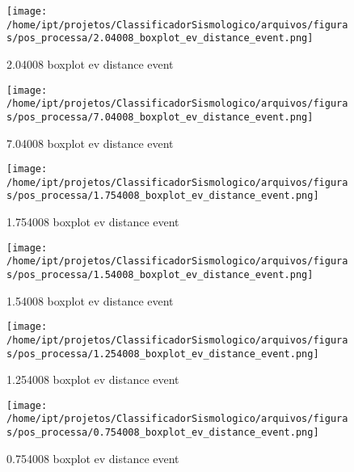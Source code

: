     \begin{figure}[H]
        \centering
        \texttt{[image: /home/ipt/projetos/ClassificadorSismologico/arquivos/figuras/pos\_processa/2.04008\_boxplot\_ev\_distance\_event.png]}
        \caption{2.04008 boxplot ev distance event}
        \label{fig:2.04008_boxplot_ev_distance_event}
    \end{figure}
                

    \begin{figure}[H]
        \centering
        \texttt{[image: /home/ipt/projetos/ClassificadorSismologico/arquivos/figuras/pos\_processa/7.04008\_boxplot\_ev\_distance\_event.png]}
        \caption{7.04008 boxplot ev distance event}
        \label{fig:7.04008_boxplot_ev_distance_event}
    \end{figure}
                

    \begin{figure}[H]
        \centering
        \texttt{[image: /home/ipt/projetos/ClassificadorSismologico/arquivos/figuras/pos\_processa/1.754008\_boxplot\_ev\_distance\_event.png]}
        \caption{1.754008 boxplot ev distance event}
        \label{fig:1.754008_boxplot_ev_distance_event}
    \end{figure}
                

    \begin{figure}[H]
        \centering
        \texttt{[image: /home/ipt/projetos/ClassificadorSismologico/arquivos/figuras/pos\_processa/1.54008\_boxplot\_ev\_distance\_event.png]}
        \caption{1.54008 boxplot ev distance event}
        \label{fig:1.54008_boxplot_ev_distance_event}
    \end{figure}
                

    \begin{figure}[H]
        \centering
        \texttt{[image: /home/ipt/projetos/ClassificadorSismologico/arquivos/figuras/pos\_processa/1.254008\_boxplot\_ev\_distance\_event.png]}
        \caption{1.254008 boxplot ev distance event}
        \label{fig:1.254008_boxplot_ev_distance_event}
    \end{figure}
                

    \begin{figure}[H]
        \centering
        \texttt{[image: /home/ipt/projetos/ClassificadorSismologico/arquivos/figuras/pos\_processa/0.754008\_boxplot\_ev\_distance\_event.png]}
        \caption{0.754008 boxplot ev distance event}
        \label{fig:0.754008_boxplot_ev_distance_event}
    \end{figure}
                

